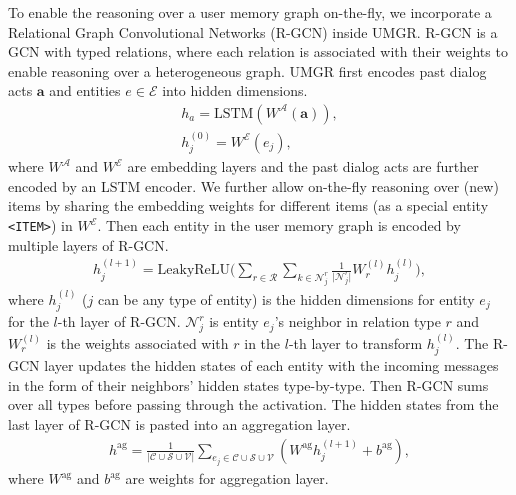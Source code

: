 To enable the reasoning over a user memory graph on-the-fly, we incorporate a Relational Graph Convolutional Networks (R-GCN) \cite{schlichtkrull2018modeling} inside UMGR.
R-GCN is a GCN \cite{kipf2016semi} with typed relations, where each relation is associated with their weights to enable reasoning over a heterogeneous graph.
UMGR first encodes past dialog acts $\boldsymbol{a}$ and entities $e \in \mathcal{E}$ into hidden dimensions.
\begin{equation}
\begin{split}
h_a = \text{LSTM}(W^\mathcal{A}(\boldsymbol{a})), \\
h_j^{(0)} = W^\mathcal{E}(e_j),
\end{split}
\end{equation}
where $W^\mathcal{A}$ and $W^\mathcal{E}$ are embedding layers and the past dialog acts are further encoded by an LSTM encoder.
We further allow on-the-fly reasoning over (new) items by sharing the embedding weights for different items (as a special entity \texttt{<ITEM>}) in $W^\mathcal{E}$. 
Then each entity in the user memory graph is encoded by multiple layers of R-GCN.
\begin{equation}
\begin{split}
h_j^{(l+1)}=\text{LeakyReLU} \Big(\sum_{r \in \mathcal{R}} \sum_{k \in \mathcal{N}_j^r} \frac{1}{\vert \mathcal{N}_j^r \vert} W_r^{(l)} h_j^{(l)}\Big),
\end{split}
\end{equation}
where $h_j^{(l)}$ ($j$ can be any type of entity) is the hidden dimensions for entity $e_j$ for the $l$-th layer of R-GCN. $\mathcal{N}_j^r$ is entity $e_j$'s neighbor in relation type $r$ and $W_r^{(l)}$ is the weights associated with $r$ in the $l$-th layer to transform $h_j^{(l)}$.
The R-GCN layer updates the hidden states of each entity with the incoming messages in the form of their neighbors' hidden states type-by-type.
Then R-GCN sums over all types before passing through the activation.
The hidden states from the last layer of R-GCN is pasted into an aggregation layer.
\begin{equation}
\begin{split}
h^{\text{ag}} = \frac{1}{\vert \mathcal{C} \cup \mathcal{S} \cup \mathcal{V} \vert} \sum_{e_j \in \mathcal{C} \cup \mathcal{S} \cup \mathcal{V}} (W^\text{ag} h_j^{(l+1)} + b^{\text{ag}}),
\end{split}
\end{equation}
where $W^{\text{ag}}$ and $b^{\text{ag}}$ are weights for aggregation layer.

